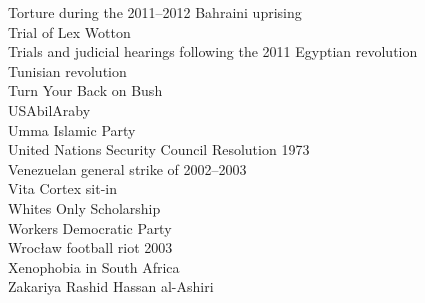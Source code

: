 Torture during the 2011–2012 Bahraini uprising\\
Trial of Lex Wotton\\
Trials and judicial hearings following the 2011 Egyptian revolution\\
Tunisian revolution\\
Turn Your Back on Bush\\
USAbilAraby\\
Umma Islamic Party\\
United Nations Security Council Resolution 1973\\
Venezuelan general strike of 2002–2003\\
Vita Cortex sit-in\\
Whites Only Scholarship\\
Workers Democratic Party\\
Wrocław football riot 2003\\
Xenophobia in South Africa\\
Zakariya Rashid Hassan al-Ashiri
